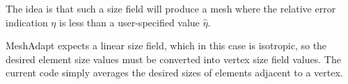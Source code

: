\documentclass{article}
\begin{document}
The idea is that such a size field will produce a mesh where the relative
error indication $\eta$ is less than a user-specified value $\hat{\eta}$.

MeshAdapt expects a linear size field, which in this case is isotropic, 
so the desired element size values must be converted into vertex size field
values. The current code simply averages the desired sizes of elements 
adjacent to a vertex.
 
\end{document}
